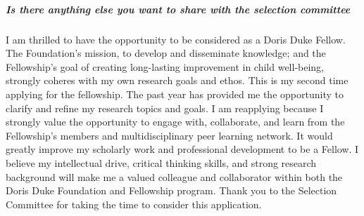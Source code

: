 \documentclass[twocolumn, issue, rga, authordate]{jote-new-article}
\begin{document}
\subparagraph{Is there anything else you want to share with the selection committee}


I am thrilled to have the opportunity to be considered as a Doris Duke
Fellow. The Foundation's mission, to develop and disseminate knowledge;
and the Fellowship's goal of creating long-lasting improvement in child
well-being, strongly coheres with my own research goals and ethos. This
is my second time applying for the fellowship. The past year has
provided me the opportunity to clarify and refine my research topics and
goals. I am reapplying because I strongly value the opportunity to
engage with, collaborate, and learn from the Fellowship's members and
multidisciplinary peer learning network. It would greatly improve my
scholarly work and professional development to be a Fellow. I believe my
intellectual drive, critical thinking skills, and strong research
background will make me a valued colleague and collaborator within both
the Doris Duke Foundation and Fellowship program. Thank you to the
Selection Committee for taking the time to consider this application.
\end{document}

